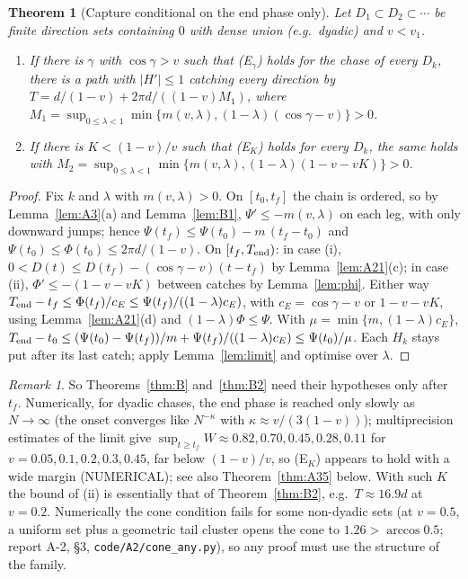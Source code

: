 \documentclass[11pt]{article}
\newtheorem{theorem}{Theorem}
\theoremstyle{remark}\newtheorem{remark}{Remark}
\begin{document}
\begin{theorem}[Capture conditional on the end phase only]\label{thm:A23}
Let $D_1\subset D_2\subset\cdots$ be finite direction sets containing $0$ with dense union (e.g.\ dyadic) and $v<v_1$.
\begin{enumerate}
\item[(i)] If there is $\gamma$ with $\cos\gamma>v$ such that (E$_\gamma$) holds for the chase of every $D_k$, there is a path with
$|H'|\le1$ catching every direction by $T=d/(1-v)+2\pi d/((1-v)M_1)$, where
$M_1=\sup_{0\le\lambda<1}\min\{m(v,\lambda),(1-\lambda)(\cos\gamma-v)\}>0$.
\item[(ii)] If there is $K<(1-v)/v$ such that (E$_K$) holds for every $D_k$, the same holds with
$M_2=\sup_{0\le\lambda<1}\min\{m(v,\lambda),(1-\lambda)(1-v-vK)\}>0$.
\end{enumerate}
\end{theorem}
\begin{proof}
Fix $k$ and $\lambda$ with $m(v,\lambda)>0$. On $[t_0,t_f]$ the chain is ordered, so by Lemma~\ref{lem:A3}(a) and Lemma~\ref{lem:B1},
$\Psi'\le-m(v,\lambda)$ on each leg, with only downward jumps; hence $\Psi(t_f)\le\Psi(t_0)-m\,(t_f-t_0)$ and
$\Psi(t_0)\le\Phi(t_0)\le2\pi d/(1-v)$. On $[t_f,T_{\rm end})$: in case (i), $0<D(t)\le D(t_f)-(\cos\gamma-v)(t-t_f)$ by
Lemma~\ref{lem:A21}(c); in case (ii), $\Phi'\le-(1-v-vK)$ between catches by Lemma~\ref{lem:phi}. Either way
$T_{\rm end}-t_f\le\Phi(t_f)/c_E\le\Psi(t_f)/((1-\lambda)c_E)$, with $c_E=\cos\gamma-v$ or $1-v-vK$, using Lemma~\ref{lem:A21}(d) and
$(1-\lambda)\Phi\le\Psi$. With $\mu=\min\{m,(1-\lambda)c_E\}$, $T_{\rm end}-t_0\le(\Psi(t_0)-\Psi(t_f))/m+\Psi(t_f)/((1-\lambda)c_E)\le\Psi(t_0)/\mu$.
Each $H_k$ stays put after its last catch; apply Lemma~\ref{lem:limit} and optimise over $\lambda$.
\end{proof}
\begin{remark}
So Theorems~\ref{thm:B} and~\ref{thm:B2} need their hypotheses only after $t_f$. Numerically, for dyadic chases, the end phase
is reached only slowly as $N\to\infty$ (the onset converges like $N^{-\kappa}$ with $\kappa\approx v/(3(1-v))$); multiprecision
estimates of the limit give $\sup_{t\ge t_f}W\approx0.82,0.70,0.45,0.28,0.11$ for $v=0.05,0.1,0.2,0.3,0.45$, far below $(1-v)/v$,
so (E$_K$) appears to hold with a wide margin (NUMERICAL); see also Theorem~\ref{thm:A35} below. With such $K$ the bound of (ii) is essentially that of
Theorem~\ref{thm:B2}, e.g.\ $T\approx16.9d$ at $v=0.2$. Numerically the cone condition fails for some non-dyadic sets (at $v=0.5$, a uniform set plus a geometric tail cluster opens the cone to $1.26>\arccos0.5$; report A-2, \S3, \texttt{code/A2/cone\_any.py}), so any proof
must use the structure of the family.
\end{remark}
\end{document}
